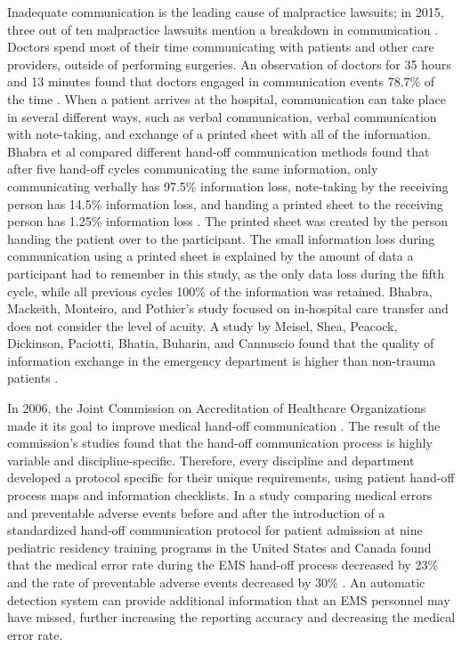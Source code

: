 \par Inadequate communication is the leading cause of malpractice lawsuits; in 2015, three out of ten malpractice lawsuits mention a breakdown in communication \cite{CRICOStrategies.2015}. Doctors spend most of their time communicating with patients and other care providers, outside of performing surgeries. An observation of doctors for 35 hours and 13 minutes found that doctors engaged in communication events 78.7\% of the time \cite{Spencer2004}. When a patient arrives at the hospital, communication can take place in several different ways, such as verbal communication, verbal communication with note-taking, and exchange of a printed sheet with all of the information. Bhabra et al compared different hand-off communication methods found that after five hand-off cycles communicating the same information, only communicating verbally has 97.5\% information loss, note-taking by the receiving person has 14.5\% information loss, and handing a printed sheet to the receiving person has 1.25\% information loss \cite{Bhabra2007}. The printed sheet was created by the person handing the patient over to the participant. The small information loss during communication using a printed sheet is explained by the amount of data a participant had to remember in this study, as the only data loss during the fifth cycle, while all previous cycles 100\% of the information was retained. Bhabra, Mackeith, Monteiro, and Pothier’s study focused on in-hospital care transfer and does not consider the level of acuity. A study by Meisel, Shea, Peacock, Dickinson, Paciotti, Bhatia, Buharin, and Cannuscio found that the quality of information exchange in the emergency department is higher than non-trauma patients \cite{Meisel2015}.
\par In 2006, the Joint Commission on Accreditation of Healthcare Organizations made it its goal to improve medical hand-off communication \cite{Arora2006}. The result of the commission’s studies found that the hand-off communication process is highly variable and discipline-specific. Therefore, every discipline and department developed a protocol specific for their unique requirements, using patient hand-off process maps and information checklists. In a study comparing medical errors and preventable adverse events before and after the introduction of a standardized hand-off communication protocol for patient admission at nine pediatric residency training programs in the United States and Canada found that the medical error rate during the EMS hand-off process decreased by 23\% and the rate of preventable adverse events decreased by 30\% \cite{Starmer2014}. An automatic detection system can provide additional information that an \gls{EMS} personnel may have missed, further increasing the reporting accuracy and decreasing the medical error rate.
